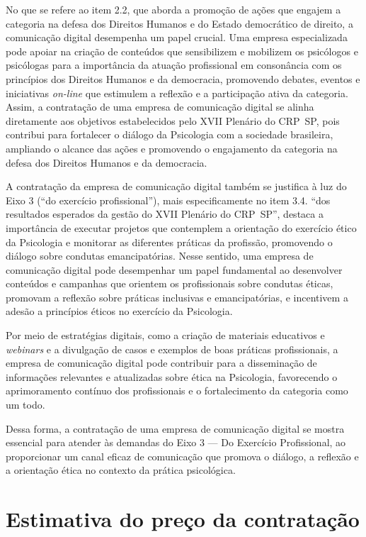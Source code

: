 \documentclass[oneside,a4paper,article]{memoir}
\begin{document}
No que se refere ao item 2.2, que aborda a promoção de ações que
engajem a categoria na defesa dos Direitos Humanos e do Estado
democrático de direito, a comunicação digital desempenha um papel
crucial. Uma empresa especializada pode apoiar na criação de conteúdos
que sensibilizem e mobilizem os psicólogos e psicólogas para a
importância da atuação profissional em consonância com os princípios dos
Direitos Humanos e da democracia, promovendo debates, eventos e
iniciativas  \textit{on-line} que estimulem a reflexão e a participação ativa da
categoria. Assim, a contratação de uma empresa de comunicação digital se
alinha diretamente aos objetivos estabelecidos pelo XVII Plenário do
CRP~SP, pois contribui para fortalecer o diálogo da Psicologia com a
sociedade brasileira, ampliando o alcance das ações e promovendo o
engajamento da categoria na defesa dos Direitos Humanos e da democracia.

A contratação da empresa de comunicação digital também se justifica
à luz do Eixo 3 (``do exercício profissional''), mais especificamente no
item 3.4. ``dos resultados esperados da gestão do XVII Plenário do CRP~SP'',
destaca a importância de executar projetos que contemplem a orientação
do exercício ético da Psicologia e monitorar as diferentes práticas da
profissão, promovendo o diálogo sobre condutas emancipatórias. Nesse
sentido, uma empresa de comunicação digital pode desempenhar um papel
fundamental ao desenvolver conteúdos e campanhas que orientem os
profissionais sobre condutas éticas, promovam a reflexão sobre práticas
inclusivas e emancipatórias, e incentivem a adesão a princípios éticos
no exercício da Psicologia.

Por meio de estratégias digitais, como a criação de materiais
educativos e \textit{webinars} e a divulgação de casos e exemplos de boas
práticas profissionais, a empresa de comunicação digital pode contribuir
para a disseminação de informações relevantes e atualizadas sobre ética
na Psicologia, favorecendo o aprimoramento contínuo dos profissionais e
o fortalecimento da categoria como um todo.

Dessa forma, a contratação de uma empresa de comunicação digital se
mostra essencial para atender às demandas do Eixo 3 --- Do Exercício
Profissional, ao proporcionar um canal eficaz de comunicação que promova
o diálogo, a reflexão e a orientação ética no contexto da prática
psicológica.

\chapter{Estimativa do preço da contratação}
\end{document}
